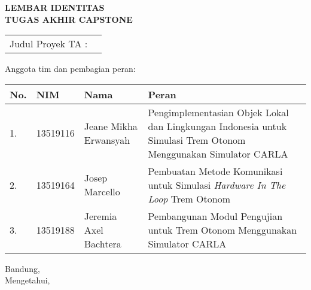 \clearpage
\pagestyle{empty}

\begin{center}
	\smallskip

	\Large \bfseries \MakeUppercase{
		Lembar Identitas \\
		Tugas Akhir Capstone
	}
	\vspace{0.5cm}

	\raggedright
	\begin{table}[h!]
		\large \bfseries
		\begin{onehalfspace}
		\begin{tabular}{p{} p{}}
			Judul Proyek TA : & \capstonetitle \\
		\end{tabular}
		\end{onehalfspace}
	\end{table}

	\normalsize \normalfont

	Anggota tim dan pembagian peran:

	\begin{table}[h!]
		\begin{onehalfspace}
		\begingroup
		\def\arraystretch{1.25}
		\begin{tabular}{|p{} | p{} | p{} | p{0.50\textwidth}|}
			\hline
			\textbf{No.} & \textbf{NIM} & \textbf{Nama}         & \textbf{Peran}                                                                                                 \\
			\hline
			1.           & 13519116     & Jeane Mikha Erwansyah & Pengimplementasian Objek Lokal dan Lingkungan Indonesia untuk Simulasi Trem Otonom Menggunakan Simulator CARLA \\
			\hline
			2.           & 13519164     & Josep Marcello        & Pembuatan Metode Komunikasi untuk Simulasi \textit{Hardware In The Loop} Trem Otonom                           \\
			\hline
			3.           & 13519188     & Jeremia Axel Bachtera & Pembangunan Modul Pengujian untuk Trem Otonom Menggunakan Simulator CARLA                                      \\
			\hline
		\end{tabular}
		\endgroup
		\end{onehalfspace}
	\end{table}

	\vfill
	\begin{center}
		\normalsize \normalfont
		Bandung, \thedate \\
		Mengetahui,
	\end{center}
	\advisorapproval

\end{center}
\clearpage
